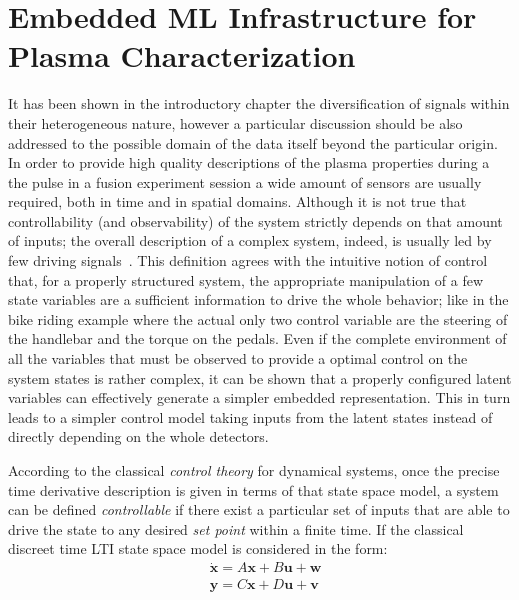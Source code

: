 
\chapter{Embedded ML Infrastructure for Plasma Characterization}

It has been shown in the introductory chapter the diversification of signals within their heterogeneous nature, however a particular discussion should be also addressed to the possible domain of the data itself beyond the particular origin.
In order to provide high quality descriptions of the plasma properties during a the pulse in a fusion experiment session a wide amount of sensors are usually required, both in time and in spatial domains.
Although it is not true that controllability (and observability) of the system strictly depends on that amount of inputs; the overall description of a complex system, indeed, is usually led by few driving signals~\cite{Liu2011}. 
This definition agrees with the intuitive notion of control that, for a properly structured system, the appropriate manipulation of a few state variables are a sufficient information to drive the whole behavior; like in the bike riding example where the actual only two control variable are the steering of the handlebar and the torque on the pedals. Even if the complete environment of all the variables that must be observed to provide a optimal control on the system states is rather complex, it can be shown that a properly configured latent variables can effectively generate a simpler embedded representation. This in turn leads to a simpler control model taking inputs from the latent states instead of directly depending on the whole detectors.

According to the classical \textit{control theory} for dynamical systems, once the precise time derivative description is given in terms of that state space model, a system can be defined \textit{controllable} if there exist a particular set of inputs that are able to drive the state to any desired \textit{set point} within a finite time. 
If the classical discreet time \acl{LTI} state space model is considered in the form:
\begin{align}
    & \dot{\bm{x}} = A\bm{x} + B\bm{u} + \bm{w}\\
    & \bm{y} = C\bm{x} + D\bm{u} + \bm{v}
    \label{eq:ss_model}
\end{align}

